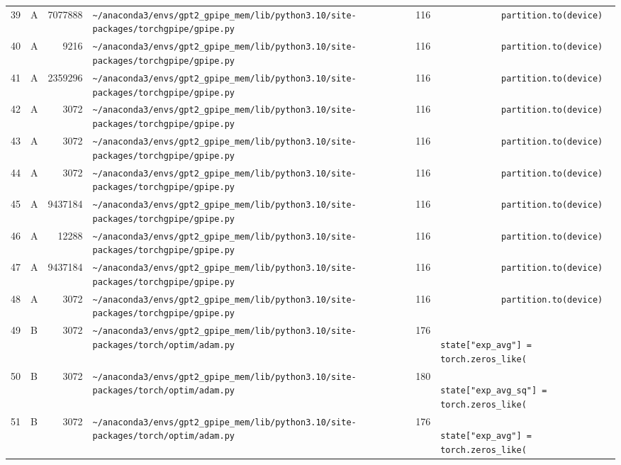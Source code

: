 \documentclass{article}
\begin{document}
\begin{longtable}{r l r p{6.5cm} r p{7.0cm}}
39 & A & 7077888 & \lstinline|~/anaconda3/envs/gpt2_gpipe_mem/lib/python3.10/site-packages/torchgpipe/gpipe.py| & 116 & \lstinline|            partition.to(device)| \\
40 & A & 9216 & \lstinline|~/anaconda3/envs/gpt2_gpipe_mem/lib/python3.10/site-packages/torchgpipe/gpipe.py| & 116 & \lstinline|            partition.to(device)| \\
41 & A & 2359296 & \lstinline|~/anaconda3/envs/gpt2_gpipe_mem/lib/python3.10/site-packages/torchgpipe/gpipe.py| & 116 & \lstinline|            partition.to(device)| \\
42 & A & 3072 & \lstinline|~/anaconda3/envs/gpt2_gpipe_mem/lib/python3.10/site-packages/torchgpipe/gpipe.py| & 116 & \lstinline|            partition.to(device)| \\
43 & A & 3072 & \lstinline|~/anaconda3/envs/gpt2_gpipe_mem/lib/python3.10/site-packages/torchgpipe/gpipe.py| & 116 & \lstinline|            partition.to(device)| \\
44 & A & 3072 & \lstinline|~/anaconda3/envs/gpt2_gpipe_mem/lib/python3.10/site-packages/torchgpipe/gpipe.py| & 116 & \lstinline|            partition.to(device)| \\
45 & A & 9437184 & \lstinline|~/anaconda3/envs/gpt2_gpipe_mem/lib/python3.10/site-packages/torchgpipe/gpipe.py| & 116 & \lstinline|            partition.to(device)| \\
46 & A & 12288 & \lstinline|~/anaconda3/envs/gpt2_gpipe_mem/lib/python3.10/site-packages/torchgpipe/gpipe.py| & 116 & \lstinline|            partition.to(device)| \\
47 & A & 9437184 & \lstinline|~/anaconda3/envs/gpt2_gpipe_mem/lib/python3.10/site-packages/torchgpipe/gpipe.py| & 116 & \lstinline|            partition.to(device)| \\
48 & A & 3072 & \lstinline|~/anaconda3/envs/gpt2_gpipe_mem/lib/python3.10/site-packages/torchgpipe/gpipe.py| & 116 & \lstinline|            partition.to(device)| \\
49 & B & 3072 & \lstinline|~/anaconda3/envs/gpt2_gpipe_mem/lib/python3.10/site-packages/torch/optim/adam.py| & 176 & \lstinline|                    state["exp_avg"] = torch.zeros_like(| \\
50 & B & 3072 & \lstinline|~/anaconda3/envs/gpt2_gpipe_mem/lib/python3.10/site-packages/torch/optim/adam.py| & 180 & \lstinline|                    state["exp_avg_sq"] = torch.zeros_like(| \\
51 & B & 3072 & \lstinline|~/anaconda3/envs/gpt2_gpipe_mem/lib/python3.10/site-packages/torch/optim/adam.py| & 176 & \lstinline|                    state["exp_avg"] = torch.zeros_like(| \\

\end{longtable}
\end{document}

